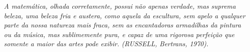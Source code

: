 
\renewcommand{\epigraphname}{EPÍGRAFE}

\begin{epigrafe}

\textit{A matemática, olhada corretamente, possui não apenas verdade, mas suprema beleza, uma beleza fria e austera, como aquela da escultura, sem apelo a qualquer parte da nossa natureza mais fraca, sem as encantadoras armadilhas da pintura ou da música, mas sublimemente pura, e capaz de uma rigorosa perfeição que somente a maior das artes pode exibir. (RUSSELL, Bertrans, 1970).}

\end{epigrafe}


